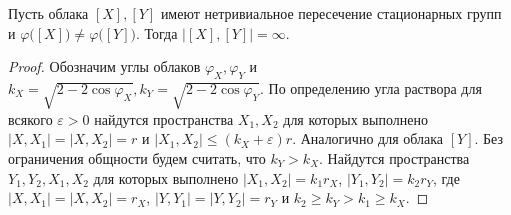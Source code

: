 \begin{theorem}
  Пусть облака $[X],[Y]$ имеют нетривиальное пересечение стационарных групп и $\varphi\big([X]\big)\neq \varphi\big([Y]\big)$. Тогда $\big|[X],[Y]\big|=\infty$.
\end{theorem}

\begin{proof}
  Обозначим углы облаков $ \varphi_X, \varphi_Y $ и $ k_X = \sqrt{2-2\cos \varphi_X},  k_Y = \sqrt{2-2\cos \varphi_Y} $. По определению угла раствора для всякого $ \varepsilon > 0 $ найдутся пространства $ X_1,X_2 $ для которых выполнено $ |X,X_1|=|X,X_2| = r $ и  $ |X_1,X_2|\le (k_X + \varepsilon) r $. Аналогично для облака $[Y]$. Без ограничения общности будем считать, что $ k_Y > k_X $. Найдутся пространства $Y_1, Y_2, X_1, X_2$ для которых выполнено $|X_1,X_2| = k_1 r_X$, $|Y_1,Y_2| = k_2 r_Y$, где $ |X,X_1|=|X,X_2| = r_X $, $ |Y,Y_1|=|Y,Y_2| = r_Y $ и $k_2 \ge k_Y > k_1 \ge k_X $. 

\end{proof}

  

